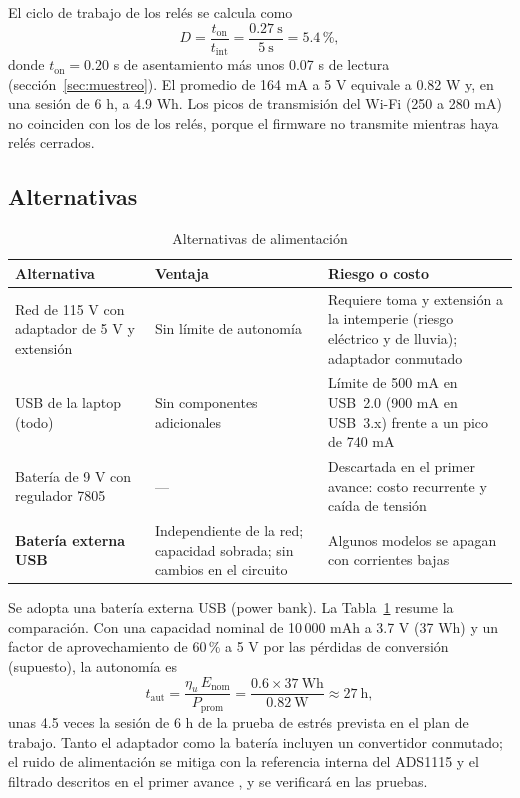 \documentclass[10pt,letterpaper,twocolumn]{article}
\begin{document}
El ciclo de trabajo de los relés se calcula como
\begin{equation}
D=\frac{t_\mathrm{on}}{t_\mathrm{int}}=\frac{0.27\ \mathrm{s}}{5\ \mathrm{s}}=5.4\,\%,
\end{equation}
donde $t_\mathrm{on}=0.20$ s de asentamiento más unos 0.07 s de lectura (sección~\ref{sec:muestreo}). El promedio de 164 mA a 5 V equivale a 0.82 W y, en una sesión de 6 h, a 4.9 Wh. Los picos de transmisión del Wi-Fi (250 a 280 mA) no coinciden con los de los relés, porque el firmware no transmite mientras haya relés cerrados.

\subsection{Alternativas}
\begin{table}[t]
\centering
\caption{Alternativas de alimentación}
\label{tab:alim}
\footnotesize
\begin{tabularx}{\columnwidth}{@{}>{\raggedright\arraybackslash}p{1.75cm}>{\raggedright\arraybackslash}X>{\raggedright\arraybackslash}X@{}}
\toprule
Alternativa & Ventaja & Riesgo o costo\\
\midrule
Red de 115 V con adaptador de 5 V y extensión & Sin límite de autonomía & Requiere toma y extensión a la intemperie (riesgo eléctrico y de lluvia); adaptador conmutado\\
USB de la laptop (todo) & Sin componentes adicionales & Límite de 500 mA en USB~2.0 (900 mA en USB~3.x) frente a un pico de 740 mA\\
Batería de 9 V con regulador 7805 & --- & Descartada en el primer avance: costo recurrente y caída de tensión\\
\textbf{Batería externa USB} & Independiente de la red; capacidad sobrada; sin cambios en el circuito & Algunos modelos se apagan con corrientes bajas\\
\bottomrule
\end{tabularx}
\end{table}

Se adopta una batería externa USB (power bank). La Tabla~\ref{tab:alim} resume la comparación. Con una capacidad nominal de 10\,000 mAh a 3.7 V (37 Wh) y un factor de aprovechamiento de 60\,\% a 5 V por las pérdidas de conversión (supuesto), la autonomía es
\begin{equation}
t_\mathrm{aut}=\frac{\eta_u\,E_\mathrm{nom}}{P_\mathrm{prom}}=\frac{0.6\times 37\ \mathrm{Wh}}{0.82\ \mathrm{W}}\approx 27\ \mathrm{h},
\end{equation}
unas 4.5 veces la sesión de 6 h de la prueba de estrés prevista en el plan de trabajo. Tanto el adaptador como la batería incluyen un convertidor conmutado; el ruido de alimentación se mitiga con la referencia interna del ADS1115 y el filtrado descritos en el primer avance \cite{avance1}, y se verificará en las pruebas.
\end{document}
